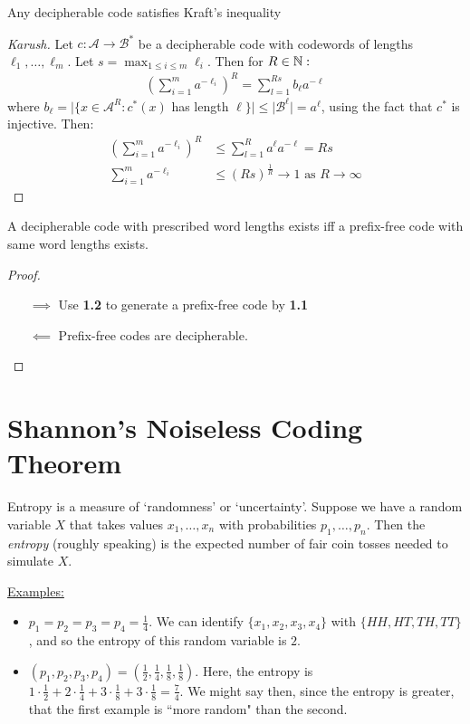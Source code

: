 \documentclass[10pt,a4paper]{article}
\begin{document}
\begin{theorem}[McMillan]
Any decipherable code satisfies Kraft's inequality
\end{theorem}
\begin{proof}[Karush]
Let $c:\mathcal{A} \to \mathcal{B}^{\ast}$ be a decipherable code with codewords of lengths $\ell_1, \ldots, \ell_m$. Let $s = \max_{1 \leq i\leq m} \ell_i$. Then for $R \in \mathbb{N}:$
\begin{align*}
\left(\sum_{i=1}^{m} a^{-\ell_i}\right)^R = \sum_{l=1}^{Rs} b_{\ell}a^{-\ell}
\end{align*}
where $b_{\ell} = |\{x \in \mathcal{A}^R : c^{\ast}(x)$ has length $\ell\}| \leq |\mathcal{B}^{\ell}| = a^{\ell}$, using the fact that $c^{\ast}$ is injective. Then:
\begin{align*}
\left(\sum_{i=1}^m a^{-\ell_i}\right)^R &\leq \sum_{l=1}^R a^\ell a^{-\ell} = Rs\\
\sum_{i=1}^m a^{-\ell_i} &\leq (Rs)^{\frac1R} \to 1 \text{ as } R \to \infty
\end{align*}
\end{proof}

\begin{corollary}
A decipherable code with prescribed word lengths exists iff a prefix-free code with same word lengths exists.
\end{corollary}
\begin{proof}
\item
\begin{itemize}
\item[$\implies$] Use \textbf{1.2} to generate a prefix-free code by \textbf{1.1}
\item[$\impliedby$] Prefix-free codes are decipherable.
\end{itemize}
\end{proof}

\section{Shannon's Noiseless Coding Theorem}
Entropy is a measure of `randomness' or `uncertainty'. Suppose we have a random variable $X$ that takes values $x_1, \ldots, x_n$ with probabilities $p_1, \ldots, p_n$. Then the \emph{entropy} (roughly speaking) is the expected number of fair coin tosses needed to simulate $X$.

\hspace*{-1em}\underline{Examples:}
\begin{itemize}
\item $p_1 = p_2 = p_3 = p_4 = \frac14$. We can identify $\{x_1, x_2, x_3, x_4\}$ with $\{HH, HT, TH, TT\}$, and so the entropy of this random variable is $2$.

\item $(p_1, p_2, p_3, p_4)=(\frac12,\frac14,\frac18,\frac18)$. Here, the entropy is $1\cdot\frac12+2\cdot\frac14+3\cdot\frac18+3\cdot\frac18 = \frac74$. We might say then, since the entropy is greater, that the first example is ``more random" than the second.
\end{itemize}
\end{document}
